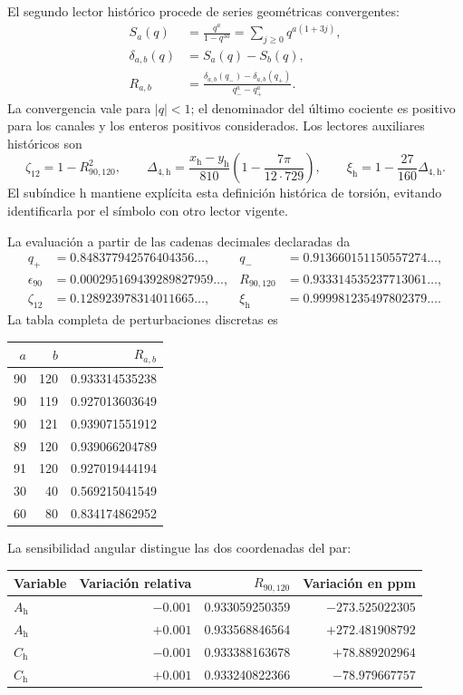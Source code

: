 El segundo lector histórico procede de series geométricas convergentes:
\begin{align*}
 S_a(q)&=\frac{q^a}{1-q^{3a}}
       =\sum_{j\geq0}q^{a(1+3j)},\\
 \delta_{a,b}(q)&=S_a(q)-S_b(q),\\
 R_{a,b}&=\frac{\delta_{a,b}(q_-)-\delta_{a,b}(q_+)}
 {q_-^a-q_+^a}.
\end{align*}
La convergencia vale para $|q|<1$; el denominador del último cociente es
positivo para los canales y los enteros positivos considerados. Los lectores
auxiliares históricos son
\[
 \zeta_{12}=1-R_{90,120}^2,\qquad
 \Delta_{4,\mathrm h}=\frac{x_{\mathrm h}-y_{\mathrm h}}{810}
 \left(1-\frac{7\pi}{12\cdot729}\right),\qquad
 \xi_{\mathrm h}=1-\frac{27}{160}\Delta_{4,\mathrm h}.
\]
El subíndice $\mathrm h$ mantiene explícita esta definición histórica de
torsión, evitando identificarla por el símbolo con otro lector vigente.

La evaluación a partir de las cadenas decimales declaradas da
\begin{align*}
 q_+&=0.848377942576404356\ldots,&
 q_-&=0.913660151150557274\ldots,\\
 \epsilon_{90}&=0.000295169439289827959\ldots,&
 R_{90,120}&=0.933314535237713061\ldots,\\
 \zeta_{12}&=0.128923978314011665\ldots,&
 \xi_{\mathrm h}&=0.999981235497802379\ldots.
\end{align*}
La tabla completa de perturbaciones discretas es
\begin{center}
\begin{tabular}{rrr}
\toprule
$a$&$b$&$R_{a,b}$\\\midrule
90&120&0.933314535238\\
90&119&0.927013603649\\
90&121&0.939071551912\\
89&120&0.939066204789\\
91&120&0.927019444194\\
30&40&0.569215041549\\
60&80&0.834174862952\\
\bottomrule
\end{tabular}
\end{center}
La sensibilidad angular distingue las dos coordenadas del par:
\begin{center}
\begin{tabular}{lrrr}
\toprule
Variable&Variación relativa&$R_{90,120}$&Variación en ppm\\\midrule
$A_{\mathrm h}$&$-0.001$&0.933059250359&$-273.525022305$\\
$A_{\mathrm h}$&$+0.001$&0.933568846564&$+272.481908792$\\
$C_{\mathrm h}$&$-0.001$&0.933388163678&$+78.889202964$\\
$C_{\mathrm h}$&$+0.001$&0.933240822366&$-78.979667757$\\
\bottomrule
\end{tabular}
\end{center}

